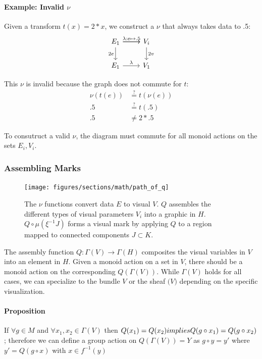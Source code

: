 \documentclass[../main.tex]{subfiles}
\begin{document}
\paragraph{Example: Invalid $\nu$}
Given a transform $t(x) = 2*x$, we construct a $\nu$ that always takes data to .5: 
\begin{equation}
    \label{eq:nu_equation_bad}
    \begin{tikzcd}
        E_1 \arrow[r] \arrow[r, "\lambda:e\mapsto.5"] \arrow[d, "2e"'] & V_i \arrow[d, "2v"] \\
        E_1 \arrow[r, "\lambda"]                                        & V_1                 
    \end{tikzcd}
\end{equation}

This $\nu$ is invalid because the graph does not commute for $t$:
\begin{align}
    \nu(t(e)) & \overset{?}{=} t(\nu(e))\\
    .5 & \overset{?}{=} t(.5)\\
    .5 & \neq 2*.5
\end{align}

To consutruct a valid $\nu$, the diagram must commute for all monoid actions on the sets $E_i, V_i$.


\subsubsection{Assembling Marks}
\begin{figure}[H]
    \texttt{[image: figures/sections/math/path\_of\_q]}
    \label{fig:q}
    \caption{The $\nu$ functions convert data $E$ to visual $V$. $Q$ assembles the different types of visual parameters $V_{i}$ into a graphic in $H$. $Q\circ\mu(\xi^{-1}J)$ forms a visual mark by applying $Q$ to a region mapped to connected components $J \subset K$.}  
\end{figure}

The assembly function $Q: \Gamma(V) \rightarrow \Gamma(H)$ composites the visual variables in $V$ into an element in $H$. Given a monoid action on a set in $V$, there should be a monoid action on the corresponding $Q(\Gamma(V))$. While $\Gamma(V)$ holds for all cases, we can specialize to the bundle $V$ or the sheaf $\mathcal(V)$ depending on the specific visualization. 

\paragraph{Proposition}
If $\forall g \in M$ and $\forall x_1, x_2 \in \Gamma(V)$ then  $Q(x_1) = Q(x_2) \\implies Q(g\circ x_1) = Q(g\circ x_2)$; therefore we can define a group action on $Q(\Gamma(V))=Y$ as $g \circ y = y'$ where $y' = Q(g\circ x)$ with $x \in f^{-1}(y)$ 
\end{document}
